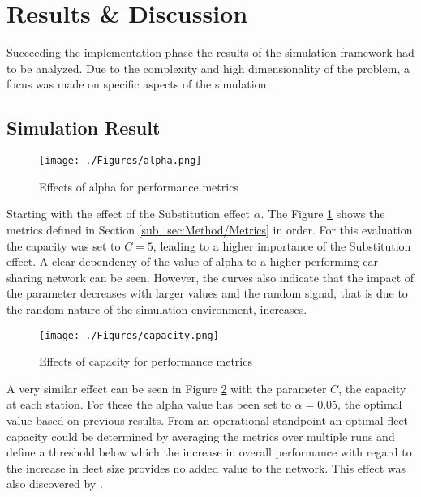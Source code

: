 \clearpage
\section{Results \& Discussion}
\label{sec:Results}


Succeeding the implementation phase the results of the simulation framework had to be analyzed. Due
to the complexity and high dimensionality of the problem, a focus was made on specific aspects of
the simulation.

\subsection{Simulation Result}
\label{sub_sec:Results/Results}

\begin{figure}[htbp]
  \centering
  \texttt{[image: ./Figures/alpha.png]}
  \caption{Effects of alpha for performance metrics}
  \label{fig:Alpha}
\end{figure}

Starting with the effect of the Substitution effect $\alpha$. The Figure \ref{fig:Alpha} shows the
metrics defined in Section \ref{sub_sec:Method/Metrics} in order. For this evaluation the capacity
was set to $C = 5$, leading to a higher importance of the Substitution effect. A clear dependency
of the value of alpha to a higher performing car-sharing network can be seen. However, the curves
also indicate that the impact of the parameter decreases with larger values and the random
signal, that is due to the random nature of the simulation environment, increases.

\begin{figure}[htbp]
  \centering
  \texttt{[image: ./Figures/capacity.png]}
  \caption{Effects of capacity for performance metrics}
  \label{fig:Capacity}
\end{figure}

A very similar effect can be seen in Figure \ref{fig:Capacity} with the parameter $C$,
the capacity at each station. For these the alpha value has been set to $\alpha = 0.05$,
the optimal value based on previous results. From an operational standpoint an optimal
fleet capacity could be determined by averaging the metrics over multiple runs
and define a threshold below which the increase in overall performance with regard to the
increase in fleet size provides no added value to the network. This effect was also discovered
by .

